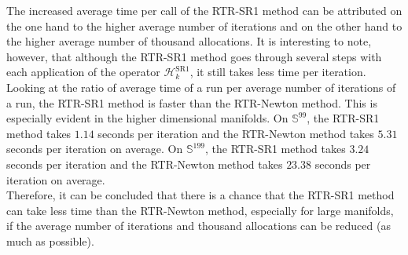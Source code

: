 The increased average time per call of the RTR-SR1 method can be attributed on the one hand to the higher average number of iterations and on the other hand to the higher average number of thousand allocations. It is interesting to note, however, that although the RTR-SR1 method goes through several steps with each application of the operator $\mathcal{H}^{\mathrm{SR1}}_k$, it still takes less time per iteration. Looking at the ratio of average time of a run per average number of iterations of a run, the RTR-SR1 method is faster than the RTR-Newton method. This is especially evident in the higher dimensional manifolds. On $\mathbb{S}^{99}$, the RTR-SR1 method takes $1.14$ seconds per iteration and the RTR-Newton method takes $5.31$ seconds per iteration on average. On $\mathbb{S}^{199}$, the RTR-SR1 method takes $3.24$ seconds per iteration and the RTR-Newton method takes $23.38$ seconds per iteration on average. \\
Therefore, it can be concluded that there is a chance that the RTR-SR1 method can take less time than the RTR-Newton method, especially for large manifolds, if the average number of iterations and thousand allocations can be reduced (as much as possible).
